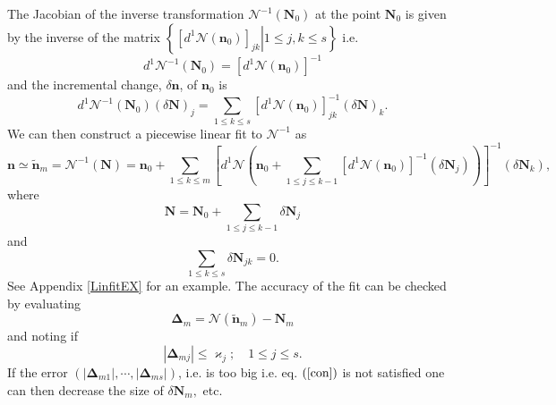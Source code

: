 \documentclass[aps,preprint]{revtex4}%
\begin{document}
The Jacobian of the inverse transformation $\mathcal{N}^{-1}\left(
\mathbf{N}_{0}\right)  $ at the point $\mathbf{N}_{0}$ is given by the inverse
of the matrix $\left\{  \left.  \left[  d^{1}\mathcal{N}\left(  \mathbf{n}%
_{0}\right)  \right]  _{jk}\right\vert 1\leq j,k\leq s\right\}  $ i.e.
\begin{equation}
d^{1}\mathcal{N}^{-1}\left(  \mathbf{N}_{0}\right)  =\left[  d^{1}%
\mathcal{N}\left(  \mathbf{n}_{0}\right)  \right]  ^{-1}%
\end{equation}
and the incremental change, $\delta\mathbf{n}$, of $\mathbf{n}_{0}$ is
\begin{equation}
d^{1}\mathcal{N}^{-1}\left(  \mathbf{N}_{0}\right)  \left(  \delta
\mathbf{N}\right)  _{j}=\sum_{1\leq k\leq s}\left[  d^{1}\mathcal{N}\left(
\mathbf{n}_{0}\right)  \right]  _{jk}^{-1}\left(  \delta\mathbf{N}\right)
_{k}.
\end{equation}
We can then construct a piecewise linear fit to $\mathcal{N}^{-1}$ as%
\begin{equation}
\mathbf{n}\simeq\mathbf{\tilde{n}}_{m}=\mathcal{N}^{-1}\left(  \mathbf{N}%
\right)  =\mathbf{n}_{0}+\sum_{1\leq k\leq m}\left[  d^{1}\mathcal{N}\left(
\mathbf{n}_{0}+\sum_{1\leq j\leq k-1}\left[  d^{1}\mathcal{N}\left(
\mathbf{n}_{0}\right)  \right]  ^{-1}\left(  \delta\mathbf{N}_{j}\right)
\right)  \right]  ^{-1}\left(  \delta\mathbf{N}_{k}\right)  ,
\end{equation}
where
\begin{equation}
\mathbf{N=N}_{0}+\sum_{1\leq j\leq k-1}\delta\mathbf{N}_{j}%
\end{equation}
and
\begin{equation}
\sum_{1\leq k\leq s}\delta\mathbf{N}_{jk}=0.
\end{equation}
See Appendix \ref{LinfitEX} for an example. The accuracy of the fit can be
checked by evaluating
\begin{equation}
\mathbf{\Delta}_{m}=\mathcal{N}\left(  \mathbf{\tilde{n}}_{m}\right)
-\mathbf{N}_{m}%
\end{equation}
and noting if
\begin{equation}
\left\vert \mathbf{\Delta}_{mj}\right\vert \leq\varkappa_{j};\quad1\leq j\leq
s.\label{con}%
\end{equation}
If the error $\left(  \left\vert \mathbf{\Delta}_{m1}\right\vert
,\cdots,\left\vert \mathbf{\Delta}_{ms}\right\vert \right)  $, i.e. is too big
i.e. eq. $\left(  \ref{con}\right)  $ is not satisfied one can then decrease
the size of $\delta\mathbf{N}_{m},$ etc.
\end{document}
